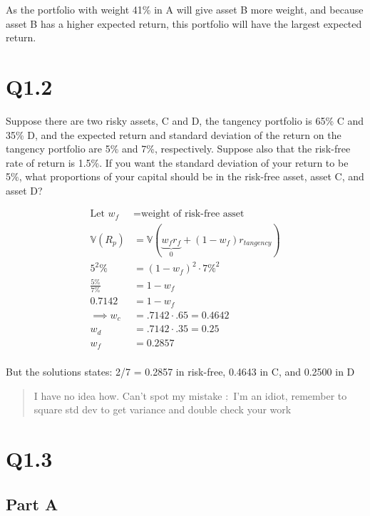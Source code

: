 \documentclass[
  oneside]{book}
\begin{document}
As the portfolio with weight 41\% in A will give asset B more weight, and because asset B has a higher expected return, this portfolio will have the largest expected return.

\hypertarget{q1.2}{%
\section{Q1.2}\label{q1.2}}

Suppose there are two risky assets, C and D, the tangency portfolio is 65\% C and 35\% D, and the expected return and standard deviation of the return on the tangency portfolio are 5\% and 7\%, respectively. Suppose also that the risk-free rate of return is 1.5\%. If you want the standard deviation of your return to be 5\%, what proportions of your capital should be in the risk-free asset, asset C, and asset D?

\[
\begin{aligned}
\text{Let } w_{f} &= \text{weight of risk-free asset}\\
\mathbb{V}(R_{p}) &= \mathbb{V}(\underbrace{ w_{f}r_{f} }_{ 0 } + (1-w_{f})r_{tangency})\\
5^{2}\% &= (1-w_{f})^{2}\cdot 7\%^{2}\\
\frac{5\%}{7\%} &= 1-w_{f}\\
0.7142 &= 1-w_{f}\\
\implies w_{c} &= .7142\cdot .65 = 0.4642\\
w_{d} &= .7142\cdot .35 = 0.25\\
w_{f} &= 0.2857\\
\end{aligned}
\]

But the solutions states:
2/7 = 0.2857 in risk-free, 0.4643 in C, and 0.2500 in D

\begin{quote}
I have no idea how. Can't spot my mistake :~I'm an idiot, remember to square std dev to get variance and double check your work 🥴
\end{quote}

\hypertarget{q1.3}{%
\section{Q1.3}\label{q1.3}}

\hypertarget{part-a-6}{%
\subsection{Part A}\label{part-a-6}}
\end{document}
